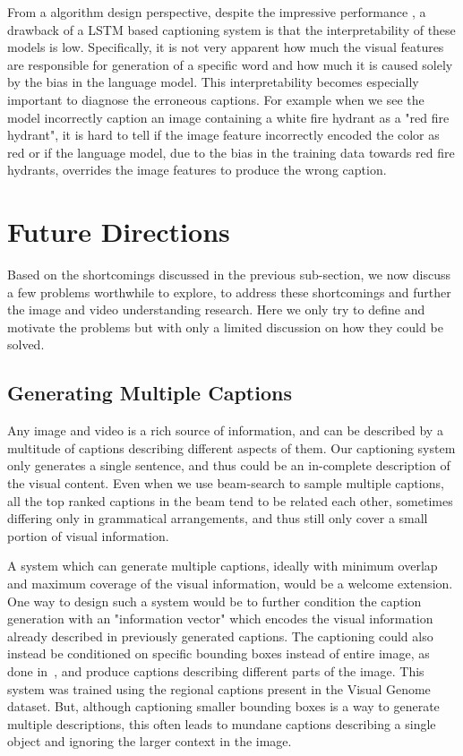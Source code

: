 From a algorithm design perspective, despite the impressive performance , a
drawback of a LSTM based captioning system is that the interpretability of
these models is low.
Specifically, it is not very apparent how much the visual features are
responsible for generation of a specific word and how much it is caused solely
by the bias in the language model.
This interpretability becomes especially important to diagnose the erroneous
captions.
For example when we see the model incorrectly caption an image containing a white
fire hydrant as a "red fire hydrant", it is hard to tell if the image feature
incorrectly encoded the color as red or if the language model, due to the bias
in the training data towards red fire hydrants, overrides the image features to
produce the wrong caption.  

\section{Future Directions}
Based on the shortcomings discussed in the previous sub-section, we now discuss
a few problems worthwhile to explore, to address these shortcomings and
further the image and video understanding research.
Here we only try to define and motivate the problems but with only a limited
discussion on how they could be solved.

\subsection{Generating Multiple Captions}
Any image and video is a rich source of information, and can be described by a
multitude of captions describing different aspects of them. 
Our captioning system only generates a single sentence, and thus could be an
in-complete description of the visual content.
Even when we use beam-search to sample multiple captions, all the top ranked
captions in the beam tend to be related each other, sometimes differing only in
grammatical arrangements, and thus still only cover a small portion of visual
information.

A system which can generate multiple captions, ideally with minimum overlap
and maximum coverage of the visual information, would be a welcome extension.
One way to design such a system would be to further condition the caption
generation with an "information vector" which encodes the visual information
already described in previously generated captions.
The captioning could also instead be conditioned on specific bounding boxes
instead of entire image, as done in~\cite{johnson2015densecap}, and produce
captions describing different parts of the image.
This system was trained using the regional captions present in the Visual
Genome dataset.
But, although captioning smaller bounding boxes is a way to generate multiple
descriptions, this often leads to mundane captions describing a single object
and ignoring the larger context in the image.

